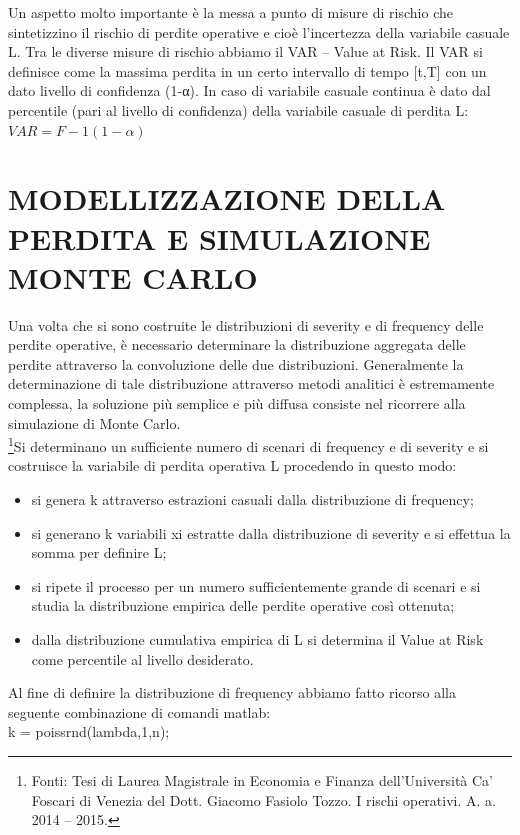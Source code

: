 \documentclass[titlepage]{article}
\begin{document}
\begin{itemize}
 Un aspetto molto importante è la messa a punto di misure di rischio che sintetizzino il rischio di perdite operative e cioè l’incertezza della variabile casuale L. Tra le diverse misure di rischio abbiamo il VAR – Value at Risk. Il VAR si definisce come la massima perdita in un certo intervallo di tempo [t,T] con un dato livello di confidenza (1-α). In caso di variabile casuale continua è dato dal percentile (pari al livello di confidenza) della variabile casuale di perdita L:\\
 $VAR=F-1(1-\alpha)$


\section{MODELLIZZAZIONE DELLA PERDITA E SIMULAZIONE MONTE CARLO}
Una volta che si sono costruite le distribuzioni di severity e di frequency delle perdite operative, è necessario determinare la distribuzione aggregata delle perdite attraverso la convoluzione delle due distribuzioni. Generalmente la determinazione di tale distribuzione attraverso metodi analitici è estremamente complessa, la soluzione più semplice e più diffusa consiste nel ricorrere alla simulazione di Monte Carlo.
\\
\footnote{Fonti: Tesi di Laurea Magistrale in Economia e Finanza dell’Università Ca’ Foscari di Venezia del Dott. Giacomo Fasiolo Tozzo. I rischi operativi. A. a. 2014 – 2015.}Si determinano un sufficiente numero di scenari di frequency e di severity e si costruisce la variabile di perdita operativa L procedendo in questo modo:

\begin{itemize}
\item si genera k attraverso estrazioni casuali dalla distribuzione di frequency;
\item	si generano k variabili xi estratte dalla distribuzione di severity e si effettua la somma per definire L;
\item	si ripete il processo per un numero sufficientemente grande di scenari e si studia la distribuzione empirica delle perdite operative così ottenuta;
\item	dalla distribuzione cumulativa empirica di L si determina il Value at Risk come percentile al livello desiderato.
\end{itemize}
Al fine di definire la distribuzione di frequency abbiamo fatto ricorso alla seguente combinazione di comandi matlab:\\
k = poissrnd(lambda,1,n);
\\


\end{itemize}
\end{document}
